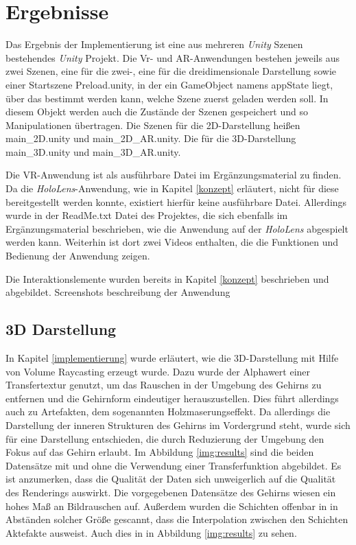

\section{Ergebnisse}
\label{ergebnisse}


Das Ergebnis der Implementierung ist eine aus mehreren \textit{Unity} Szenen bestehendes \textit{Unity} Projekt.
Die Vr- und AR-Anwendungen bestehen jeweils aus zwei Szenen, eine für die zwei-, eine für die dreidimensionale Darstellung sowie einer Startszene Preload.unity, in der ein GameObject namens appState liegt, über das bestimmt werden kann, welche Szene zuerst geladen werden soll. In diesem Objekt werden auch die Zustände der Szenen gespeichert und so Manipulationen übertragen.
Die Szenen für die 2D-Darstellung heißen main\_2D.unity und main\_2D\_AR.unity. Die für die 3D-Darstellung main\_3D.unity und main\_3D\_AR.unity.

Die VR-Anwendung ist als ausführbare Datei im Ergänzungsmaterial zu finden. Da die \textit{HoloLens}-Anwendung, wie in Kapitel \ref{konzept} erläutert, nicht für diese bereitgestellt werden konnte, existiert hierfür keine ausführbare Datei. Allerdings wurde in der ReadMe.txt Datei des Projektes, die sich ebenfalls im Ergänzungsmaterial beschrieben, wie die Anwendung auf der \textit{HoloLens} abgespielt werden kann. 
Weiterhin ist dort zwei Videos enthalten, die die Funktionen und Bedienung der Anwendung zeigen.

Die Interaktionslemente wurden bereits in Kapitel \ref{konzept} beschrieben und abgebildet. 
Screenshots
beschreibung der Anwendung

\subsection{3D Darstellung}

In Kapitel \ref{implementierung} wurde erläutert, wie die 3D-Darstellung mit Hilfe von Volume Raycasting erzeugt wurde. 
Dazu wurde der Alphawert einer Transfertextur genutzt, um das Rauschen in der Umgebung des Gehirns zu entfernen und die Gehirnform eindeutiger herauszustellen. Dies führt allerdings auch zu Artefakten, dem sogenannten Holzmaserungseffekt. Da allerdings die Darstellung der inneren Strukturen des Gehirns im Vordergrund steht, wurde sich für eine Darstellung entschieden, die durch Reduzierung der Umgebung den Fokus auf das Gehirn erlaubt. 
Im Abbildung \ref{img:results} sind die beiden Datensätze mit und ohne die Verwendung einer Transferfunktion abgebildet. 
Es ist anzumerken, dass die Qualität der Daten sich unweigerlich auf die Qualität des Renderings auswirkt. Die vorgegebenen Datensätze des Gehirns wiesen ein hohes Maß an Bildrauschen auf. Außerdem wurden die Schichten offenbar in in Abständen solcher Größe gescannt, dass die Interpolation zwischen den Schichten Aktefakte ausweist. Auch dies in in Abbildung \ref{img:results} zu sehen.

